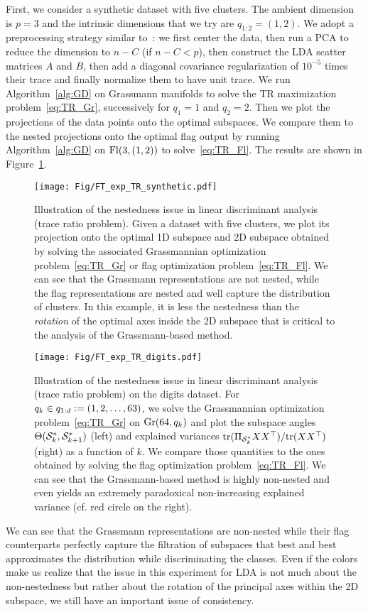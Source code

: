 First, we consider a synthetic dataset with five clusters.
The ambient dimension is $p = 3$ and the intrinsic dimensions that we try are $q_{1:2} = (1, 2)$.
We adopt a preprocessing strategy similar to~\citet{ngo_trace_2012}: we first center the data, then run a PCA to reduce the dimension to $n - C$ (if $n - C < p$), then construct the LDA scatter matrices $A$ and $B$, then add a diagonal covariance regularization of $10^{-5}$ times their trace and finally normalize them to have unit trace.
We run Algorithm~\ref{alg:GD} on Grassmann manifolds to solve the TR maximization problem~\eqref{eq:TR_Gr}, successively for $q_1 = 1$ and $q_2 = 2$. Then we plot the projections of the data points onto the optimal subspaces. We compare them to the nested projections onto the optimal flag output by running Algorithm~\ref{alg:GD} on $\Fl(3, (1, 2))$ to solve~\eqref{eq:TR_Fl}. The results are shown in Figure~\ref{fig:TR_nested}.
\begin{figure}
	\centering
    \texttt{[image: Fig/FT\_exp\_TR\_synthetic.pdf]}
    \caption{
    Illustration of the nestedness issue in linear discriminant analysis (trace ratio problem). Given a dataset with five clusters, we plot its projection onto the optimal 1D subspace and 2D subspace obtained by solving the associated Grassmannian optimization problem~\eqref{eq:TR_Gr} or flag optimization problem~\eqref{eq:TR_Fl}. 
    We can see that the Grassmann representations are not nested, while the flag representations are nested and well capture the distribution of clusters. In this example, it is less the nestedness than the \textit{rotation} of the optimal axes inside the 2D subspace that is critical to the analysis of the Grassmann-based method.
    }
	\label{fig:TR_nested}
\end{figure}
\begin{figure}
	\centering
    \texttt{[image: Fig/FT\_exp\_TR\_digits.pdf]}
    \caption{
    Illustration of the nestedness issue in linear discriminant analysis (trace ratio problem) on the digits dataset. For $q_k \in \qf := (1, 2, \dots, 63)$, we solve the Grassmannian optimization problem~\eqref{eq:TR_Gr} on $\Gr(64, q_k)$ and plot the subspace angles $\Theta(\S_k^*, \S_{k+1}^*)$ (left) and explained variances ${\operatorname{tr}(\Pi_{\S_k^*} X X\T)} / {\operatorname{tr}(X X\T)}$ (right) as a function of $k$. We compare those quantities to the ones obtained by solving the flag optimization problem~\eqref{eq:TR_Fl}. 
    We can see that the Grassmann-based method is highly non-nested and even yields an extremely paradoxical non-increasing explained variance (cf. red circle on the right).
    }
	\label{fig:TR_nested_digits}
\end{figure}
We can see that the Grassmann representations are non-nested while their flag counterparts perfectly capture the filtration of subspaces that best and best approximates the distribution while discriminating the classes. Even if the colors make us realize that the issue in this experiment for LDA  is not much about the non-nestedness but rather about the rotation of the principal axes within the 2D subspace, we still have an important issue of consistency.

